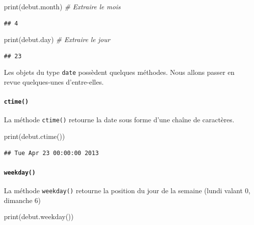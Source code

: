 \documentclass[12pt,]{book}
\newenvironment{Shaded}{\begin{snugshade}}{\end{snugshade}}
\newcommand{\CommentTok}[1]{\textcolor[rgb]{0.56,0.35,0.01}{\textit{#1}}}
\newcommand{\BuiltInTok}[1]{#1}
\newcommand{\NormalTok}[1]{#1}
\let\oldparagraph\paragraph
\renewcommand{\paragraph}[1]{\oldparagraph{#1}\mbox{}}
\numberwithin{equation}{section}
\numberwithin{countremarque}{section}
\begin{document}
\begin{Shaded}
\begin{Highlighting}[]
\BuiltInTok{print}\NormalTok{(debut.month) }\CommentTok{# Extraire le mois}
\end{Highlighting}
\end{Shaded}

\begin{lstlisting}
## 4
\end{lstlisting}

\begin{Shaded}
\begin{Highlighting}[]
\BuiltInTok{print}\NormalTok{(debut.day) }\CommentTok{# Extraire le jour}
\end{Highlighting}
\end{Shaded}

\begin{lstlisting}
## 23
\end{lstlisting}

Les objets du type \texttt{date} possèdent quelques méthodes. Nous
allons passer en revue quelques-unes d'entre-elles.

\paragraph{\texorpdfstring{\texttt{ctime()}}{ctime()}}\label{ctime}

La méthode \texttt{ctime()} retourne la date sous forme d'une chaîne de
caractères.

\begin{Shaded}
\begin{Highlighting}[]
\BuiltInTok{print}\NormalTok{(debut.ctime())}
\end{Highlighting}
\end{Shaded}

\begin{lstlisting}
## Tue Apr 23 00:00:00 2013
\end{lstlisting}

\paragraph{\texorpdfstring{\texttt{weekday()}}{weekday()}}\label{weekday}

La méthode \texttt{weekday()} retourne la position du jour de la semaine
(lundi valant 0, dimanche 6)

\begin{Shaded}
\begin{Highlighting}[]
\BuiltInTok{print}\NormalTok{(debut.weekday())}
\end{Highlighting}
\end{Shaded}
\end{document}
